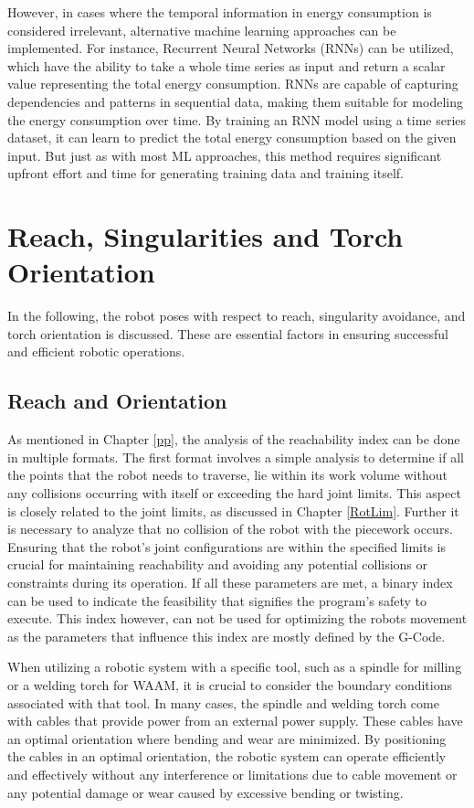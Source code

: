 However, in cases where the temporal information in energy consumption is considered irrelevant, alternative machine learning approaches can be implemented. For instance, Recurrent Neural Networks (RNNs) can be utilized, which have the ability to take a whole time series as input and return a scalar value representing the total energy consumption. RNNs are capable of capturing dependencies and patterns in sequential data, making them suitable for modeling the energy consumption over time. By training an RNN model using a time series dataset, it can learn to predict the total energy consumption based on the given input. But just as with most ML approaches, this method requires significant upfront effort and time for generating training data and training itself.


\section{Reach, Singularities and Torch Orientation}
In the following, the robot poses with respect to reach, singularity avoidance, and torch orientation is discussed. These are essential factors in ensuring successful and efficient robotic operations.
\subsection{Reach and Orientation}\label{RO}

As mentioned in Chapter \ref{pp}, the analysis of the reachability index can be done in multiple formats. The first format involves a simple analysis to determine if all the points that the robot needs to traverse, lie within its work volume  without any collisions occurring with itself or exceeding the hard joint limits. This aspect is closely related to the joint limits, as discussed in Chapter \ref{RotLim}. Further it is necessary to analyze that no collision of the robot with the piecework occurs. Ensuring that the robot's joint configurations are within the specified limits is crucial for maintaining reachability and avoiding any potential collisions or constraints during its operation. If all these parameters are met, a binary index can be used to indicate the feasibility that signifies the program's safety to execute. This index however, can not be used for optimizing the robots movement as the parameters that influence this index are mostly defined by the G-Code.

When utilizing a robotic system with a specific tool, such as a spindle for milling or a welding torch for WAAM, it is crucial to consider the boundary conditions associated with that tool. In many cases, the spindle and welding torch come with cables that provide power from an external power supply. These cables have an optimal orientation where bending and wear are minimized. By positioning the cables in an optimal orientation, the robotic system can operate efficiently and effectively without any interference or limitations due to cable movement or any potential damage or wear caused by excessive bending or twisting.

